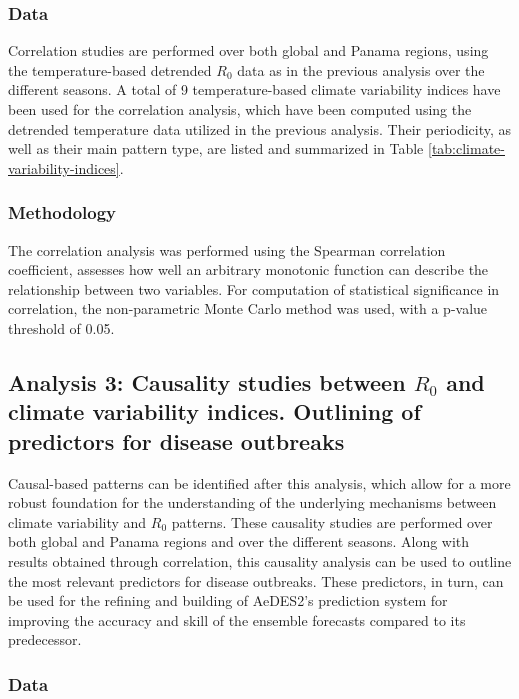 \documentclass[10pt,twocolumn]{wlscirep}
\begin{document}
\subsubsection{Data} \label{sec-methods-2-data}

Correlation studies are performed over both global and Panama regions, using the temperature-based detrended $R_0$ data as in the previous analysis over the different seasons. A total of 9 temperature-based climate variability indices have been used for the correlation analysis, which have been computed using the detrended temperature data utilized in the previous analysis. Their periodicity, as well as their main pattern type, are listed and summarized in Table \ref{tab:climate-variability-indices}.


\subsubsection{Methodology} \label{sec-methods-2-methodology}

The correlation analysis was performed using the Spearman correlation coefficient, assesses how well an arbitrary monotonic function can describe the relationship between two variables\cite{spearman_1904}. For computation of statistical significance in correlation, the non-parametric Monte Carlo method was used\cite{new_2000}, with a p-value threshold of 0.05.


\subsection{Analysis 3: Causality studies between $R_0$ and climate variability indices. Outlining of predictors for disease outbreaks} \label{sec-methods-3}

Causal-based patterns can be identified after this analysis, which allow for a more robust foundation for the understanding of the underlying mechanisms between climate variability and $R_0$ patterns. These causality studies are performed over both global and Panama regions and over the different seasons. Along with results obtained through correlation, this causality analysis can be used to outline the most relevant predictors for disease outbreaks. These predictors, in turn, can be used for the refining and building of AeDES2's prediction system for improving the accuracy and skill of the ensemble forecasts compared to its predecessor.

\subsubsection{Data} \label{sec-methods-3-data}
\end{document}
